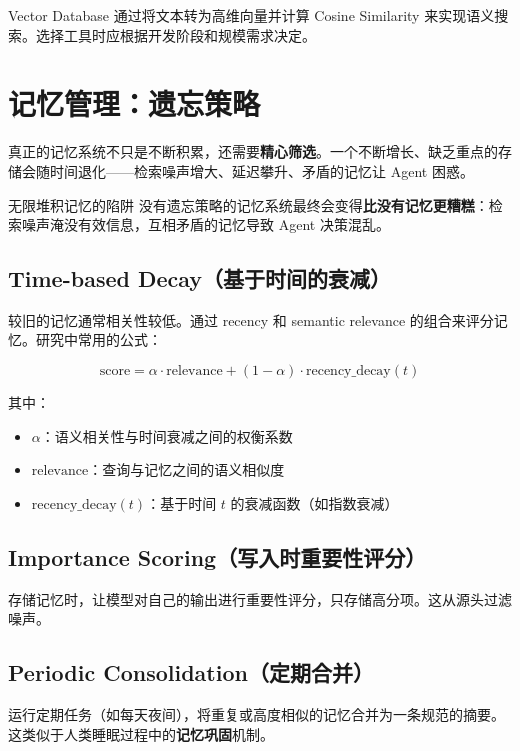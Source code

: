\documentclass[a4paper]{article}
\begin{document}
Vector Database 通过将文本转为高维向量并计算 Cosine Similarity 来实现语义搜索。选择工具时应根据开发阶段和规模需求决定。

\section{记忆管理：遗忘策略}

真正的记忆系统不只是不断积累，还需要\textbf{精心筛选}。一个不断增长、缺乏重点的存储会随时间退化——检索噪声增大、延迟攀升、矛盾的记忆让 Agent 困惑。

\begin{warningbox}{无限堆积记忆的陷阱}
没有遗忘策略的记忆系统最终会变得\textbf{比没有记忆更糟糕}：检索噪声淹没有效信息，互相矛盾的记忆导致 Agent 决策混乱。
\end{warningbox}

\subsection{Time-based Decay（基于时间的衰减）}

较旧的记忆通常相关性较低。通过 recency 和 semantic relevance 的组合来评分记忆。研究中常用的公式：

$$
\text{score} = \alpha \cdot \text{relevance} + (1 - \alpha) \cdot \text{recency\_decay}(t)
$$

其中：
\begin{itemize}[leftmargin=2em]
    \item $\alpha$：语义相关性与时间衰减之间的权衡系数
    \item $\text{relevance}$：查询与记忆之间的语义相似度
    \item $\text{recency\_decay}(t)$：基于时间 $t$ 的衰减函数（如指数衰减）
\end{itemize}

\subsection{Importance Scoring（写入时重要性评分）}

存储记忆时，让模型对自己的输出进行重要性评分，只存储高分项。这从源头过滤噪声。

\subsection{Periodic Consolidation（定期合并）}

运行定期任务（如每天夜间），将重复或高度相似的记忆合并为一条规范的摘要。这类似于人类睡眠过程中的\textbf{记忆巩固}机制。
\end{document}
